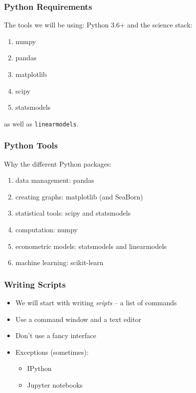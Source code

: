 \documentclass[aspectratio=169,t]{beamer}
\begin{document}
\begin{frame}
  \frametitle{Python Requirements}

  The tools we will be using: Python 3.6+ and the science stack:
  \begin{enumerate}
   \item numpy
   \item pandas
   \item matplotlib
   \item scipy
   \item statsmodels
  \end{enumerate}
  as well as \texttt{linearmodels}.

\end{frame}


\begin{frame}
  \frametitle{Python Tools}

  Why the different Python packages:
  \begin{enumerate}
   \item data management: pandas
   \item creating graphs: matplotlib (and SeaBorn)
   \item statistical tools: scipy and statsmodels
   \item computation: numpy
   \item econometric models: statsmodels and linearmodels
   \item machine learning: scikit-learn
  \end{enumerate}

\end{frame}



\begin{frame}
  \frametitle{Writing Scripts}

   \begin{itemize}
    \item We will start with writing \emph{sripts} -- a list of commands
    \item Use a command window and a text editor
    \item Don't use a fancy interface
    \item Exceptions (sometimes):
      \begin{itemize}
       \item IPython
       \item Jupyter notebooks
      \end{itemize}
   \end{itemize}

\end{frame}
\end{document}
